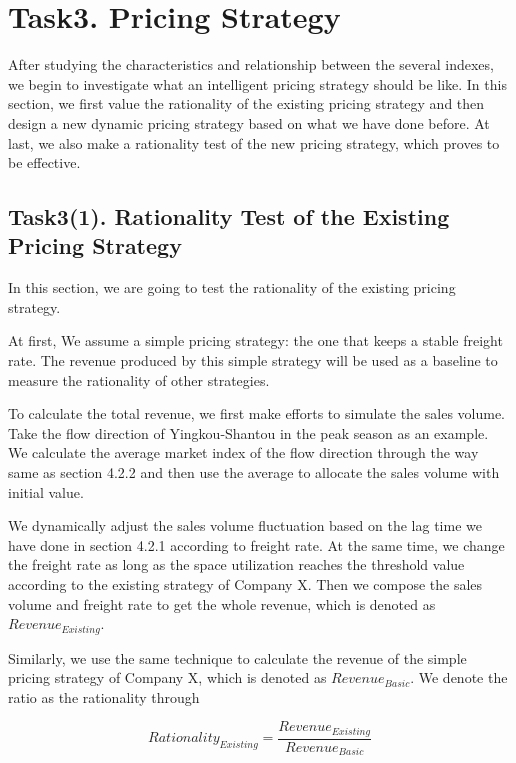 \section{Task3. Pricing Strategy}

After studying the characteristics and relationship between the several indexes, we begin to investigate what an intelligent pricing strategy \parencite{psgxr} \parencite{wtl}should be like. In this section, we first value the rationality of the existing pricing strategy and then design a new dynamic pricing strategy based on what we have done before. At last, we also make a rationality test of the new pricing strategy, which proves to be effective.

\subsection{Task3(1). Rationality Test of the Existing Pricing Strategy}

In this section, we are going to test the rationality of the existing pricing strategy.

At first, We assume a simple pricing strategy: the one that keeps a stable freight rate. The revenue produced by this simple strategy will be used as a baseline to measure the rationality of other strategies. 

To calculate the total revenue, we first make efforts to simulate the sales volume. Take the flow direction of Yingkou-Shantou in the peak season as an example. We calculate the average market index of the flow direction through the way same as section 4.2.2 and then use the average to allocate the sales volume with initial value.

We dynamically adjust the sales volume fluctuation based on the lag time we have done in section 4.2.1 according to freight rate. At the same time, we change the freight rate as long as the space utilization reaches the threshold value according to the existing strategy of Company X. Then we compose the sales volume and freight rate to get the whole revenue, which is denoted as $Revenue_{Existing}$.

Similarly, we use the same technique to calculate the revenue of the simple pricing strategy of Company X, which is denoted as $Revenue_{Basic}$. We denote the ratio as the rationality through 

\begin{equation*}
    Rationality_{Existing} = \frac{Revenue_{Existing}}{Revenue_{Basic}}
\end{equation*}

